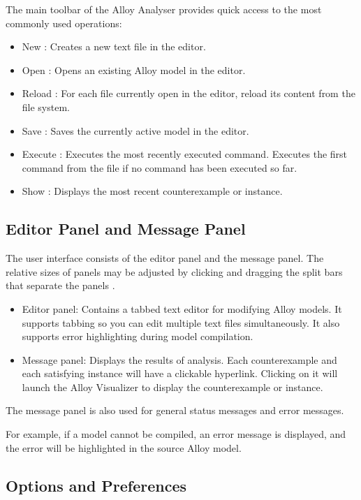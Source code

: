 \documentclass[a4paper,10pt]{report}
\begin{document}
The main toolbar of the Alloy Analyser provides quick access to the most commonly used operations:
\begin{itemize}
\item New : Creates a new text file in the editor.
\item Open : Opens an existing Alloy model in the editor.
\item Reload : For each file currently open in the editor, reload its content from the file system.
\item Save : Saves the currently active model in the editor.
\item Execute : Executes the most recently executed command. Executes the first command from the file if no command has been executed so far.
\item Show : Displays the most recent counterexample or instance.
\end{itemize}

\subsection{Editor Panel and Message Panel}
\label{Editor and Message Panel}

The user interface consists of the editor panel and the message panel. The relative sizes of panels may be adjusted by clicking and dragging the split bars that separate the panels \cite{DanielJackson}.
\begin{itemize}
\item 	Editor panel: Contains a tabbed text editor for modifying Alloy models. It supports tabbing so you can edit multiple text files simultaneously. It also supports error highlighting during model compilation.
\item 	Message panel: Displays the results of analysis. Each counterexample and each satisfying instance will have a clickable hyperlink. Clicking on it will launch the Alloy Visualizer to display the counterexample or instance.
\end{itemize}
The message panel is also used for general status messages and error messages.

For example, if a model cannot be compiled, an error message is displayed, and the error will be highlighted in the source Alloy model.

\subsection{Options and Preferences}
\label{Options & Preference}
\end{document}
